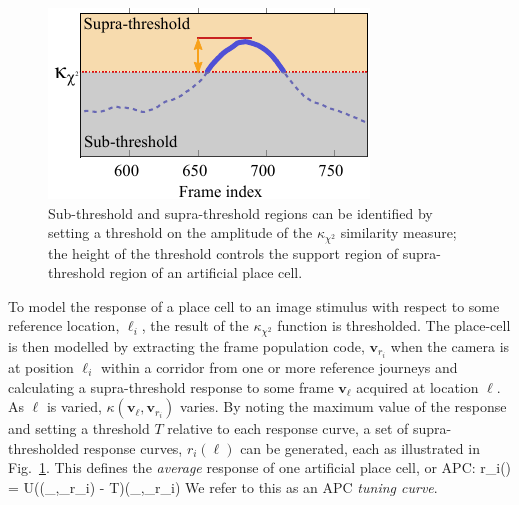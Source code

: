 \begin{figure}
\centering
  \includegraphics[width=\linewidth]{gfx/Chapter05/tuning_curve-thresh.pdf}
\caption{Sub-threshold and supra-threshold regions can be identified by setting a threshold on the amplitude of the $\kappa_{\chi^2}$ similarity measure; the height of the threshold controls the support region of supra-threshold region of an artificial place cell.}
\label{fig:Supra}
\end{figure}



To model the response of a place cell to an image stimulus with respect to some reference location, $\ell_i$, the result of the $\kappa_{\chi^2}$ function is thresholded.  The place-cell is then modelled by extracting the frame population code, $\mathbf{v}_{r_i}$ when the camera is at position $\ell_i$ within a corridor from one or more reference journeys and calculating a supra-threshold response to some frame $\mathbf{v}_{\ell}$ acquired at location $\ell$. As $\ell$ is varied, $\kappa(\mathbf{v}_{\ell},\mathbf{v}_{r_i})$ varies.  By noting the maximum value of the response and setting a threshold $T$ relative to each response curve, a set of supra-thresholded response curves, $r_i(\ell)$ can be generated, each as illustrated in Fig.~\ref{fig:Supra}. This defines the {\em average} response of one artificial place cell, or APC:
\be
r_i(\ell) = U(\kappa(_{\ell},_{r_i}) - T)\cdot \kappa(_{\ell},_{r_i})
\ee
We refer to this as an APC {\em tuning curve}.

